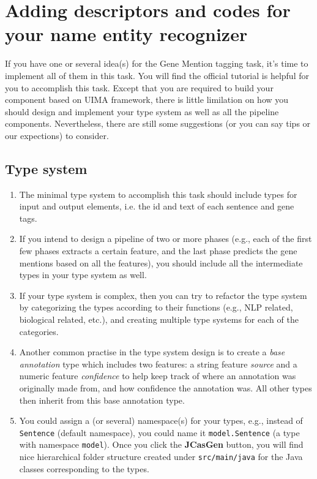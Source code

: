 
\section{Adding descriptors and codes for your name entity recognizer}

If you have one or several idea(s) for the Gene Mention tagging task, it's time
to implement all of them in this task. You will find the official tutorial is
helpful for you to accomplish this task. Except that you are required to build
your component based on UIMA framework, there is little limilation on how you
should design and implement your type system as well as all the pipeline
components. Nevertheless, there are still some suggestions (or you can say
tips or our expections) to consider.

\subsection{Type system}

\begin{enumerate}

\item The minimal type system to accomplish this task should include types for
input and output elements, i.e. the id and text of each sentence and gene tags.

\item If you intend to design a pipeline of two or more phases (e.g., each of
the first few phases extracts a certain feature, and the last phase predicts the
gene mentions based on all the features), you should include all the
intermediate types in your type system as well.

\item If your type system is complex, then you can try to refactor the type
system by categorizing the types according to their functions (e.g., NLP
related, biological related, etc.), and creating multiple type systems for each
of the categories.

\item Another common practise in the type system design is to create a
\emph{base annotation} type which includes two features: a string feature
\emph{source} and a numeric feature \emph{confidence} to help keep track of
where an annotation was originally made from, and how confidence the annotation
was. All other types then inherit from this base annotation type.

\item You could assign a (or several) namespace(s) for your types, e.g., instead
of \texttt{Sentence} (default namespace), you could name it
\texttt{model.Sentence} (a type with namespace \texttt{model}). Once you click
the \textbf{JCasGen} button, you will find nice hierarchical folder structure
created under \texttt{src/main/java} for the Java classes corresponding to the
types.

\end{enumerate}


